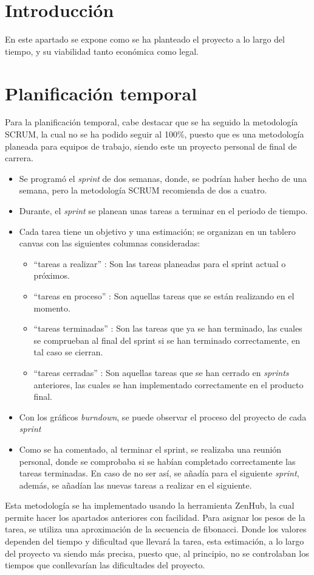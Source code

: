 
\section{Introducción}

En este apartado se expone como se ha planteado el proyecto a lo largo del tiempo, y su viabilidad tanto económica como legal. 
\section{Planificación temporal}
Para la planificación temporal, cabe destacar que se ha seguido la metodología SCRUM, la cual no se ha podido seguir al 100\%, puesto que es una metodología planeada para equipos de trabajo, siendo este un proyecto personal de final de carrera. 

\begin{itemize}
    \item Se programó el \textit{sprint} de dos semanas, donde, se podrían haber hecho de una semana, pero la metodología SCRUM recomienda de dos a cuatro.
    \item Durante, el  \textit{sprint} se planean unas tareas a terminar en el periodo de tiempo.
    \item Cada tarea tiene un objetivo y una estimación; se organizan en un tablero canvas con las siguientes columnas consideradas:
    \begin{itemize}
        \item ``tareas a realizar'' : Son las tareas planeadas para el sprint actual o próximos.
        \item ``tareas en proceso'' : Son aquellas tareas que se están realizando en el momento.
        \item ``tareas terminadas'' : Son las tareas que ya se han terminado, las cuales se comprueban al final del sprint si se han terminado correctamente, en tal caso se cierran.
        \item ``tareas cerradas'' : Son aquellas tareas que se han cerrado en \textit{sprints} anteriores, las cuales se han implementado correctamente en el producto final. 
    \end{itemize}
    \item Con los gráficos \textit{burndown}, se puede observar el proceso del proyecto de cada \textit{sprint}
    \item Como se ha comentado, al terminar el sprint, se realizaba una reunión personal, donde se comprobaba si se habían completado correctamente las tareas terminadas. En caso de no ser así, se añadía para el siguiente \textit{sprint}, además, se añadían las nuevas tareas a realizar en el siguiente.
\end{itemize}
Esta metodología se ha implementado usando la herramienta ZenHub, la cual permite hacer los apartados anteriores con facilidad.
Para asignar los pesos de la tarea, se utiliza una aproximación de la secuencia de fibonacci. Donde los valores dependen del tiempo y dificultad que llevará la tarea, esta estimación, a lo largo del proyecto va siendo más precisa, puesto que, al principio, no se controlaban los tiempos que conllevarían las dificultades del proyecto.

